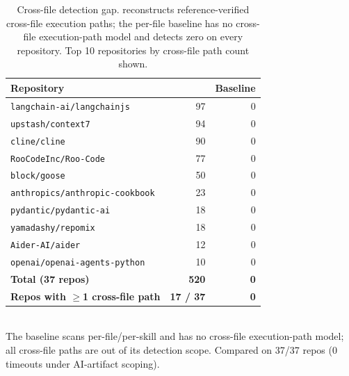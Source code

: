 \begin{table}[t]\centering\caption{Cross-file detection gap. \sysname{} reconstructs reference-verified cross-file execution paths; the per-file baseline has no cross-file execution-path model and detects zero on every repository. Top 10 repositories by cross-file path count shown.}\label{tab:crossfile}
\begin{tabular}{lrr}\toprule
Repository & \sysname{} & Baseline \\\midrule
\texttt{langchain-ai/langchainjs} & 97 & 0 \\
\texttt{upstash/context7} & 94 & 0 \\
\texttt{cline/cline} & 90 & 0 \\
\texttt{RooCodeInc/Roo-Code} & 77 & 0 \\
\texttt{block/goose} & 50 & 0 \\
\texttt{anthropics/anthropic-cookbook} & 23 & 0 \\
\texttt{pydantic/pydantic-ai} & 18 & 0 \\
\texttt{yamadashy/repomix} & 18 & 0 \\
\texttt{Aider-AI/aider} & 12 & 0 \\
\texttt{openai/openai-agents-python} & 10 & 0 \\
\midrule
\textbf{Total (37 repos)} & \textbf{520} & \textbf{0} \\
\textbf{Repos with $\geq$1 cross-file path} & \textbf{17 / 37} & \textbf{0} \\
\bottomrule\end{tabular}
\\[2pt]\footnotesize The baseline scans per-file/per-skill and has no cross-file execution-path model; all \sysname{} cross-file paths are out of its detection scope. Compared on 37/37 repos (0 timeouts under AI-artifact scoping).
\end{table}
